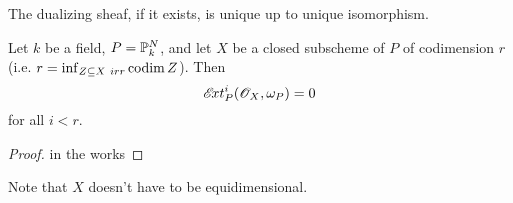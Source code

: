  \begin{corollary} The dualizing sheaf, if it exists, is unique up
 to unique isomorphism.
 \end{corollary}

 \begin{lemma} Let $k$ be a field, $P=\P^N_k$, and let $X$ be a
 closed subscheme of $P$ of codimension $r$ (i.e. $r = \inf_{Z\subseteq X\
 irr} \codim Z$).  Then
 \[
    \Ext^i_P(\O_X,\omega_P)=0
 \]
 for all $i<r$.
 \end{lemma}
 \begin{proof}
 in the works
 \end{proof}
 Note that $X$ doesn't have to be equidimensional.

